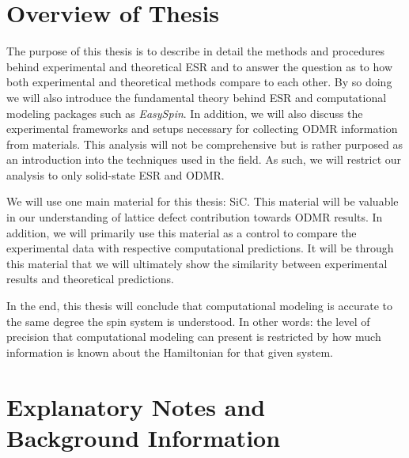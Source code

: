 \documentclass[oneside]{BYUPhys}
\begin{document}
\section{Overview of Thesis}

The purpose of this thesis is to describe in detail the methods and procedures behind experimental and theoretical ESR and to answer the question as to how both experimental and theoretical methods compare to each other. By so doing we will also introduce the fundamental theory behind ESR and computational modeling packages such as \textit{EasySpin}. In addition, we will also discuss the experimental frameworks and setups necessary for collecting ODMR information from materials. This analysis will not be comprehensive but is rather purposed as an introduction into the techniques used in the field. As such, we will restrict our analysis to only solid-state ESR and ODMR.

We will use one main material for this thesis: SiC. This material will be valuable in our understanding of lattice defect contribution towards ODMR results. In addition, we will primarily use this material as a control to compare the experimental data with respective computational predictions. It will be through this material that we will ultimately show the similarity between experimental results and theoretical predictions.

In the end, this thesis will conclude that computational modeling is accurate to the same degree the spin system is understood. In other words: the level of precision that computational modeling can present is restricted by how much information is known about the Hamiltonian for that given system.

\section{Explanatory Notes and Background Information}
\end{document}
